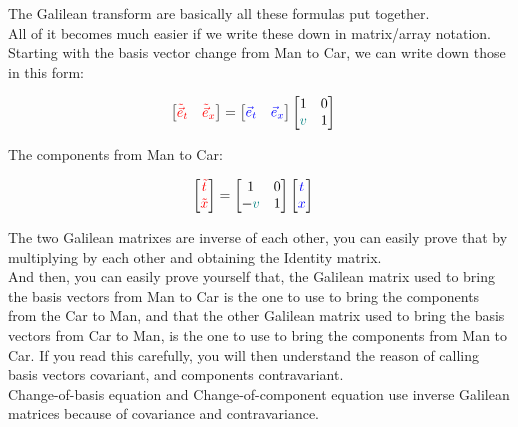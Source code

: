 The Galilean transform are basically all these formulas put together.\\
All of it becomes much easier if we write these down in matrix/array notation. 
Starting with the basis vector change from Man to Car, we can write down those in this form:

\begin{align*}
    \begin{bmatrix}
        \begingroup\color{red}\tilde{\vec{e}}_t\endgroup & \begingroup\color{red}\tilde{\vec{e}}_x\endgroup
    \end{bmatrix} &= 
    \begin{bmatrix}
        \begingroup\color{blue}\vec{e}_t\endgroup & \begingroup\color{blue}\vec{e}_x\endgroup
    \end{bmatrix}
    \begin{bmatrix}
        1 & 0\\
        \begingroup\color{teal}v\endgroup & 1
    \end{bmatrix}
\end{align*}

The components from Man to Car:
 
\begin{align*}
    \begin{bmatrix}
        \begingroup\color{red}\tilde{t}\endgroup\\ 
        \begingroup\color{red}\tilde{x}\endgroup
    \end{bmatrix} &= 
     \begin{bmatrix}
        1 & 0\\
        -\begingroup\color{teal}v\endgroup & 1
    \end{bmatrix}
    \begin{bmatrix}
        \begingroup\color{blue}t\endgroup\\ 
        \begingroup\color{blue}x\endgroup
    \end{bmatrix}
\end{align*}

The two Galilean matrixes are inverse of each other, you can easily prove that by multiplying by each other and obtaining the Identity matrix.\\
And then, you can easily prove yourself that, the Galilean matrix used to bring the basis vectors from Man to Car is the one to use
to bring the components from the Car to Man, and that the other Galilean matrix used to bring the basis vectors from Car to Man, is the one to use
to bring the components from Man to Car. If you read this carefully, you will then understand the reason of calling basis vectors covariant, and 
components contravariant.\\
Change-of-basis equation and Change-of-component equation use inverse Galilean matrices because of covariance and contravariance.\\

